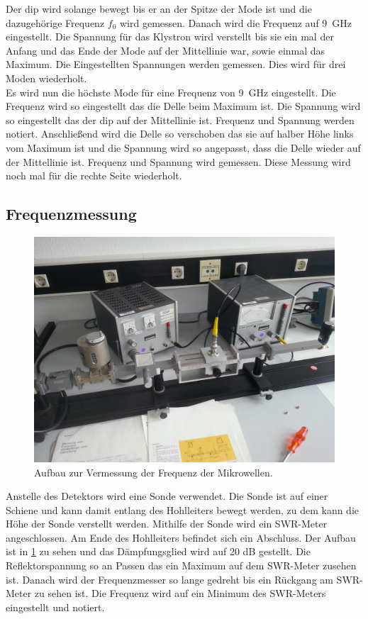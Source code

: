 Der dip wird solange bewegt bis er an der Spitze der Mode ist und die dazugehörige Frequenz $f_0$ wird gemessen. Danach wird die Frequenz auf \SI{9}{\giga\hertz} eingestellt. Die Spannung für das Klystron wird verstellt bis sie ein mal der Anfang und das Ende der Mode auf der Mittellinie war, sowie einmal das Maximum. Die Eingestellten Spannungen werden gemessen. Dies wird für drei Moden wiederholt.\\
Es wird nun die höchste Mode für eine Frequenz von \SI{9}{\giga\hertz} eingestellt. Die Frequenz wird so eingestellt das die Delle beim Maximum ist. Die Spannung wird so eingestellt das der dip auf der Mittellinie ist. Frequenz und Spannung werden notiert. Anschließend wird die Delle so verschoben das sie auf halber Höhe links vom Maximum ist und die Spannung wird so angepasst, dass die Delle wieder auf der Mittellinie ist. Frequenz und Spannung wird gemessen. Diese Messung wird noch mal für die rechte Seite wiederholt.
\subsection{Frequenzmessung}
\begin{figure}[h!]
	\centering
	\includegraphics[scale = 0.1]{../Grafiken/Aufbau_2.jpg}
	\caption{Aufbau zur Vermessung der Frequenz der Mikrowellen.}\label{fig:AufbauFrequenz}
\end{figure}
Anstelle des Detektors wird eine Sonde verwendet. Die Sonde ist auf einer Schiene und kann damit entlang des Hohlleiters bewegt werden, zu dem kann die Höhe der Sonde verstellt werden. Mithilfe der Sonde wird ein SWR-Meter angeschlossen. Am Ende des Hohlleiters befindet sich ein Abschluss. Der Aufbau ist in \cref{fig:AufbauFrequenz} zu sehen und das Dämpfungsglied wird auf 20 dB gestellt. Die Reflektorspannung so an Passen das ein Maximum auf dem SWR-Meter zusehen ist. Danach wird der Frequenzmesser so lange gedreht bis ein Rückgang am SWR-Meter zu sehen ist. Die Frequenz wird auf ein Minimum des SWR-Meters eingestellt und notiert.\newpage
